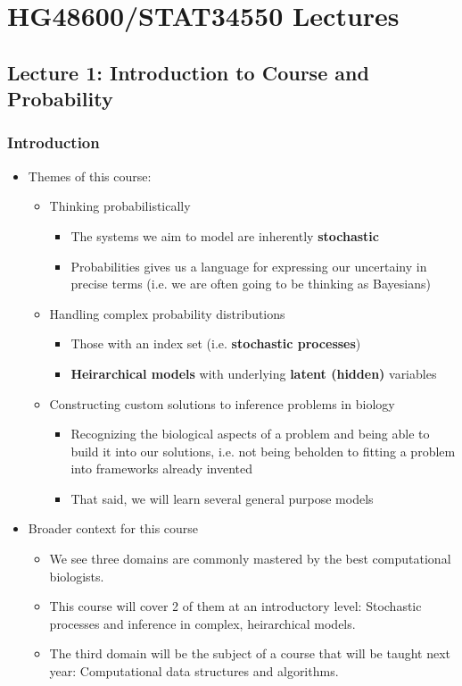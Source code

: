 \documentclass[10pt,containsverbatim,paralist]{article}
\date{\today}
\title{}
\begin{document}
\section{HG48600/STAT34550 Lectures}
\label{sec-1}
\subsection{Lecture 1: Introduction to Course and Probability}
\label{sec-1-1}
\subsubsection*{Introduction}
\label{sec-1-1-1}
\begin{itemize}
\item Themes of this course:
\label{sec-1-1-1-1}
\begin{itemize}
\item Thinking probabilistically
\label{sec-1-1-1-1-1}
\begin{itemize}
\item The systems we aim to model are inherently \textbf{stochastic}
\item Probabilities gives us a language for expressing our uncertainy in
precise terms (i.e. we are often going to be thinking as Bayesians)
\end{itemize}
\item Handling complex probability distributions
\label{sec-1-1-1-1-2}
\begin{itemize}
\item Those with an index set (i.e. \textbf{stochastic processes})
\item \textbf{Heirarchical models} with underlying \textbf{latent (hidden)} variables
\end{itemize}
\item Constructing custom solutions to inference problems in biology
\label{sec-1-1-1-1-3}
\begin{itemize}
\item Recognizing the biological aspects of a problem and being able to build it
into our solutions, i.e. not being beholden to fitting a problem into
frameworks already invented
\item That said, we will learn several general purpose models
\end{itemize}
\end{itemize}
\item Broader context for this course
\label{sec-1-1-1-2}
\begin{itemize}
\item We see three domains are commonly mastered by the best computational biologists.
\label{sec-1-1-1-2-1}
\item This course will cover 2 of them at an introductory level: Stochastic processes and inference in complex, heirarchical models.
\label{sec-1-1-1-2-2}
\item The third domain will be the subject of a course that will be taught next year: Computational data structures and algorithms.
\label{sec-1-1-1-2-3}
\end{itemize}
\end{itemize}
\end{document}
